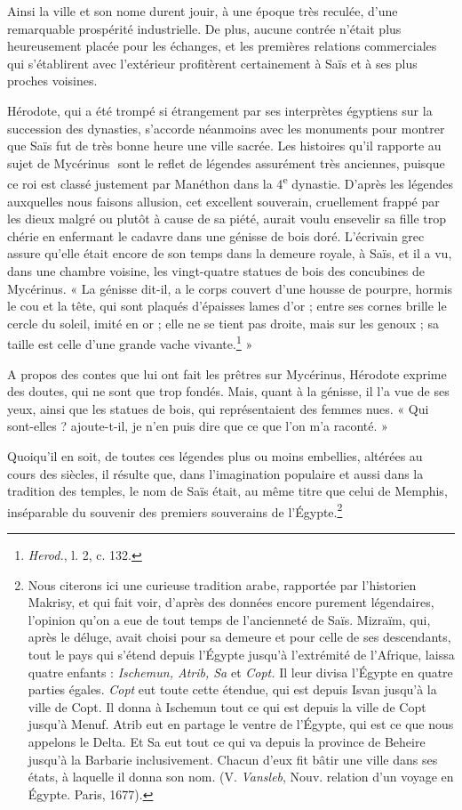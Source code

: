 \documentclass[a4paper, 11pt, oneside]{article}
\newcommand*\hieroglyhicsAAGU{}
\begin{document}
Ainsi la ville et son nome durent jouir, à une époque très reculée, d'une remarquable prospérité industrielle. De plus, aucune contrée n'était plus heureusement placée pour les échanges, et les premières relations commerciales qui s'établirent avec l'extérieur profitèrent certainement à Saïs et à ses plus proches voisines.

Hérodote, qui a été trompé si étrangement par ses interprètes égyptiens sur la succession des dynasties, s'accorde néanmoins avec les monuments pour montrer que Saïs fut de très bonne heure une ville sacrée. Les histoires qu'il rapporte au sujet de Mycérinus $\hieroglyhicsAAGU$ sont le reflet de légendes assurément très anciennes, puisque ce roi est classé justement par Manéthon dans la 4\textsuperscript{e} dynastie. D'après les légendes auxquelles nous faisons allusion, cet excellent souverain, cruellement frappé par les dieux malgré ou plutôt à cause de sa piété, aurait voulu ensevelir sa fille trop chérie en enfermant le cadavre dans une génisse de bois doré. L'écrivain grec assure qu'elle était encore de son temps dans la demeure royale, à Saïs, et il a vu, dans une chambre voisine, les vingt-quatre statues de bois des concubines de Mycérinus. « La génisse dit-il, a le corps couvert d'une housse de pourpre, hormis le cou et la tête, qui sont plaqués d'épaisses lames d'or ; entre ses cornes brille le cercle du soleil, imité en or ; elle ne se tient pas droite, mais sur les genoux ; sa taille est celle d'une grande vache vivante.\footnote{\emph{Herod.}, l. 2, c. 132.} »

A propos des contes que lui ont fait les prêtres sur Mycérinus, Hérodote exprime des doutes, qui ne sont que trop fondés. Mais, quant à la génisse, il l'a vue de ses yeux, ainsi que les statues de bois, qui représentaient des femmes nues. « Qui sont-elles ? ajoute-t-il, je n'en puis dire que ce que l'on m'a raconté. »

Quoiqu'il en soit, de toutes ces légendes plus ou moins embellies, altérées au cours des siècles, il résulte que, dans l'imagination populaire et aussi dans la tradition des temples, le nom de Saïs était, au même titre que celui de Memphis, inséparable du souvenir des premiers souverains de l'Égypte.\footnote{Nous citerons ici une curieuse tradition arabe, rapportée par l'historien Makrisy, et qui fait voir, d'après des données encore purement légendaires, l'opinion qu'on a eue de tout temps de l'ancienneté de Saïs. Mizraïm, qui, après le déluge, avait choisi pour sa demeure et pour celle de ses descendants, tout le pays qui s'étend depuis l'Égypte jusqu'à l'extrémité de l'Afrique, laissa quatre enfants : \emph{Ischemun, Atrib, Sa} et \emph{Copt.} Il leur divisa l'Égypte en quatre parties égales. \emph{Copt} eut toute cette étendue, qui est depuis Isvan jusqu'à la ville de Copt. Il donna à Ischemun tout ce qui est depuis la ville de Copt jusqu'à Menuf. Atrib eut en partage le ventre de l'Égypte, qui est ce que nous appelons le Delta. Et Sa eut tout ce qui va depuis la province de Beheire jusqu'à la Barbarie inclusivement. Chacun d'eux fit bâtir une ville dans ses états, à laquelle il donna son nom. (V. \emph{Vansleb}, Nouv. relation d'un voyage en Égypte. Paris, 1677).}
\end{document}
